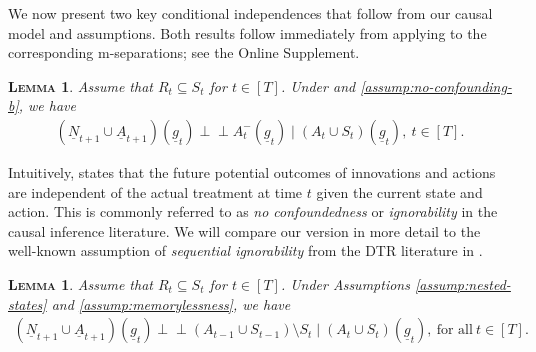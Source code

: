 \documentclass[12pt,a4paper]{article}
\newtheorem{lemma}[theorem]{\normalfont\scshape  Lemma}
\theoremstyle{definition}
\newcommand{\PP}[0]{\mathbb{P}}
\newcommand{\indep}{\perp \!\!\! \perp}
\DeclareMathOperator{\gG}{\mathscr{G}}
\begin{document}
We now present two key conditional independences that follow from our
causal model and assumptions. Both results follow immediately from
applying  to the corresponding m-separations;
see the Online Supplement.
\begin{lemma}\label{lemma:innovation_action_unconfoundedness_gt}
    Assume that $R_t \subseteq S_t$ for $t \in [T]$. Under  and \ref{assump:no-confounding-b}, we have
    \begin{align*}
        (\underline{N}_{t+1} \cup
      \underline{A}_{t+1})(\underline{g}_t) \indep
      A^{-}_t(\underline{g}_t) \mid (A_t \cup S_t)(\underline{g}_t),~t
      \in [T].
    \end{align*}
\end{lemma}
Intuitively,  states
that the future potential outcomes of innovations and actions are
independent of the actual treatment at time $t$ given the current
state and action. This is commonly referred to as \emph{no
  confoundedness} or \emph{ignorability} in the causal inference
literature. We will compare our version in more detail to the
well-known assumption of \emph{sequential ignorability} from the DTR
literature in .
\begin{lemma}\label{lemma:innovation_action_memorylessness_gt}
    Assume that $R_t \subseteq S_t$ for $t \in [T]$. Under Assumptions \ref{assump:nested-states} and \ref{assump:memorylessness}, we have
    \begin{align*}
        (\underline{N}_{t+1} \cup
      \underline{A}_{t+1})(\underline{g}_t) \indep (A_{t-1} \cup
      S_{t-1}) \setminus S_t \mid (A_t \cup
      S_t)(\underline{g}_t),~\text{for all}~t \in [T].
    \end{align*}
\end{lemma}
\end{document}
